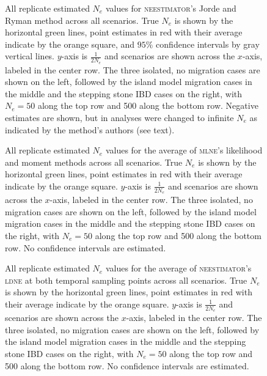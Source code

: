 \begin{landscape}
\begin{figure}[h!]
\centering
{}
\caption[All replicate estimated $N_e$ values for \textsc{neestimator}'s Jorde and Ryman method across all scenarios.]{All replicate estimated $N_e$ values for \textsc{neestimator}'s Jorde and Ryman method across all scenarios. True $N_e$ is shown by the horizontal green lines, point estimates in red with their average indicate by the orange square, and $95\%$ confidence intervals by gray vertical lines. $y$-axis is $\frac{1}{2 N_e}$ and scenarios are shown across the $x$-axis, labeled in the center row. The three isolated, no migration cases are shown on the left, followed by the island model migration cases in the middle and the stepping stone IBD cases on the right, with $N_e = 50$ along the top row and 500 along the bottom row. Negative estimates are shown, but in analyses were changed to infinite $N_e$ as indicated by the method's authors (see text).}
\label{fig:supp_}
\end{figure}


\begin{figure}[h!]
\centering
{}
\caption[All replicate estimated $N_e$ values for the average of \textsc{mlne}'s likelihood and moment methods across all scenarios.]{All replicate estimated $N_e$ values for the average of \textsc{mlne}'s likelihood and moment methods across all scenarios. True $N_e$ is shown by the horizontal green lines, point estimates in red with their average indicate by the orange square. $y$-axis is $\frac{1}{2 N_e}$ and scenarios are shown across the $x$-axis, labeled in the center row. The three isolated, no migration cases are shown on the left, followed by the island model migration cases in the middle and the stepping stone IBD cases on the right, with $N_e = 50$ along the top row and 500 along the bottom row. No confidence intervals are estimated.}
\label{fig:supp_avg1}
\end{figure}


\begin{figure}[h!]
\centering
{}
\caption[All replicate estimated $N_e$ values for the average of \textsc{neestimator}'s \textsc{ldne} at both temporal sampling points across all scenarios.]{All replicate estimated $N_e$ values for the average of \textsc{neestimator}'s \textsc{ldne} at both temporal sampling points across all scenarios. True $N_e$ is shown by the horizontal green lines, point estimates in red with their average indicate by the orange square. $y$-axis is $\frac{1}{2 N_e}$ and scenarios are shown across the $x$-axis, labeled in the center row. The three isolated, no migration cases are shown on the left, followed by the island model migration cases in the middle and the stepping stone IBD cases on the right, with $N_e = 50$ along the top row and 500 along the bottom row. No confidence intervals are estimated.}
\label{fig:supp_avg2}
\end{figure}



\end{landscape}
